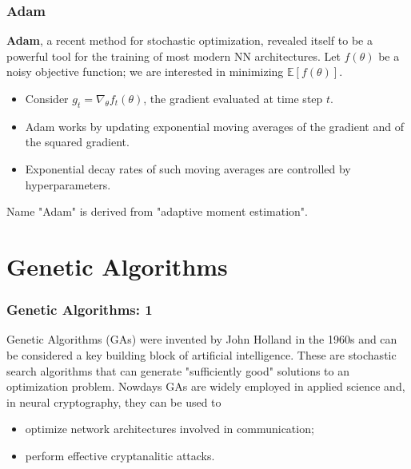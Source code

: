\documentclass{beamer}
\begin{document}
\begin{frame}
\frametitle{Adam}
\textbf{Adam}, a recent method for stochastic optimization, revealed itself to be a powerful tool for the training of most modern NN architectures. Let $f(\theta)$ be a noisy objective function; we are interested in minimizing $\mathbb{E}\left[f(\theta)\right]$.
\begin{itemize}
\item Consider $g_t = \nabla_{\theta}f_t(\theta)$, the gradient evaluated at time step $t$.
\item Adam works by updating exponential moving averages of the gradient and of the squared gradient.
\item Exponential decay rates of such moving averages are controlled by hyperparameters.
\end{itemize}
Name "Adam" is derived from "adaptive moment estimation".
\end{frame}



\section{Genetic Algorithms}

\begin{frame}
\frametitle{Genetic Algorithms: 1}
Genetic Algorithms (GAs) were invented by John Holland in the 1960s and can
be considered a key building block of artificial intelligence. These are stochastic search algorithms that can generate  
"sufficiently good" solutions to an optimization problem. Nowdays GAs are widely employed
in applied science and, in neural cryptography, they can be used to
\begin{itemize}
\item optimize network architectures involved in communication;
\item perform effective cryptanalitic attacks.
\end{itemize}
\end{frame}
\end{document}
